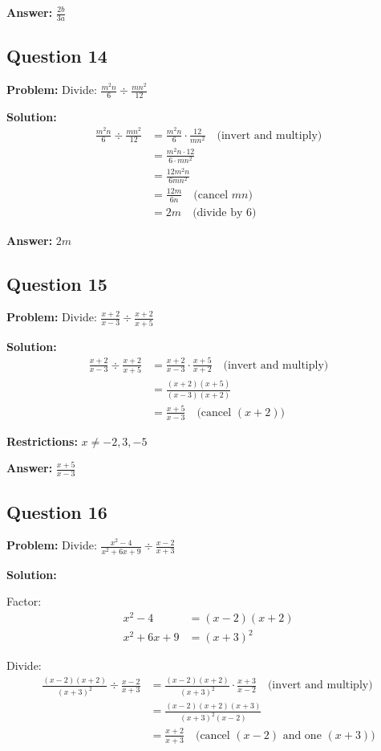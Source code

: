 \documentclass[12pt]{article}
\begin{document}
\textbf{Answer:} $\boxed{\frac{2b}{3a}}$

\subsection*{Question 14}
\textbf{Problem:} Divide: $\frac{m^2n}{6} \div \frac{mn^2}{12}$

\textbf{Solution:}
\begin{align*}
\frac{m^2n}{6} \div \frac{mn^2}{12} &= \frac{m^2n}{6} \cdot \frac{12}{mn^2} \quad \text{(invert and multiply)} \\
&= \frac{m^2n \cdot 12}{6 \cdot mn^2} \\
&= \frac{12m^2n}{6mn^2} \\
&= \frac{12m}{6n} \quad \text{(cancel } mn \text{)} \\
&= 2m \quad \text{(divide by 6)}
\end{align*}

\textbf{Answer:} $\boxed{2m}$

\subsection*{Question 15}
\textbf{Problem:} Divide: $\frac{x+2}{x-3} \div \frac{x+2}{x+5}$

\textbf{Solution:}
\begin{align*}
\frac{x+2}{x-3} \div \frac{x+2}{x+5} &= \frac{x+2}{x-3} \cdot \frac{x+5}{x+2} \quad \text{(invert and multiply)} \\
&= \frac{(x+2)(x+5)}{(x-3)(x+2)} \\
&= \frac{x+5}{x-3} \quad \text{(cancel } (x+2) \text{)}
\end{align*}

\textbf{Restrictions:} $x \neq -2, 3, -5$

\textbf{Answer:} $\boxed{\frac{x+5}{x-3}}$

\subsection*{Question 16}
\textbf{Problem:} Divide: $\frac{x^2-4}{x^2+6x+9} \div \frac{x-2}{x+3}$

\textbf{Solution:}

Factor:
\begin{align*}
x^2 - 4 &= (x-2)(x+2) \\
x^2 + 6x + 9 &= (x+3)^2
\end{align*}

Divide:
\begin{align*}
\frac{(x-2)(x+2)}{(x+3)^2} \div \frac{x-2}{x+3} &= \frac{(x-2)(x+2)}{(x+3)^2} \cdot \frac{x+3}{x-2} \quad \text{(invert and multiply)} \\
&= \frac{(x-2)(x+2)(x+3)}{(x+3)^2(x-2)} \\
&= \frac{x+2}{x+3} \quad \text{(cancel } (x-2) \text{ and one } (x+3) \text{)}
\end{align*}
\end{document}
